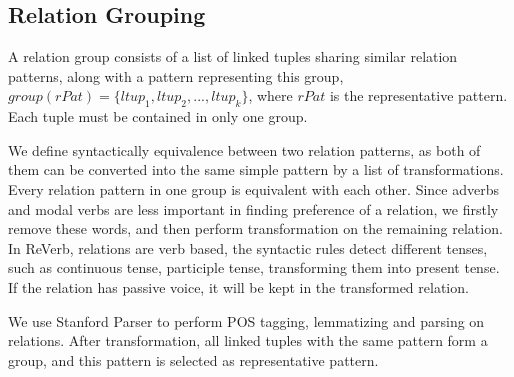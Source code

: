 \subsection{Relation Grouping}
A relation group consists of a list of linked tuples sharing similar relation patterns,
along with a pattern representing this group, $group(rPat) = \{ltup_1, ltup_2, ..., ltup_k\}$, where
$rPat$ is the representative pattern.
Each tuple must be contained in only one group.

We define syntactically equivalence between two relation patterns, as both of them can be converted
into the same simple pattern by a list of transformations. 
Every relation pattern in one group is equivalent with each other.
Since adverbs and modal verbs are less important
in finding preference of a relation, we firstly remove these words,
and then perform transformation on the remaining relation.
In ReVerb, relations are verb based, the syntactic rules detect different
tenses, such as continuous tense, participle tense, transforming them into present tense.
If the relation has passive voice, it will be kept in the transformed relation.

We use Stanford Parser \cite{klein2003accurate} to perform POS tagging, lemmatizing and parsing on relations.
After transformation, all linked tuples with the same pattern form a group, and this pattern
is selected as representative pattern.
